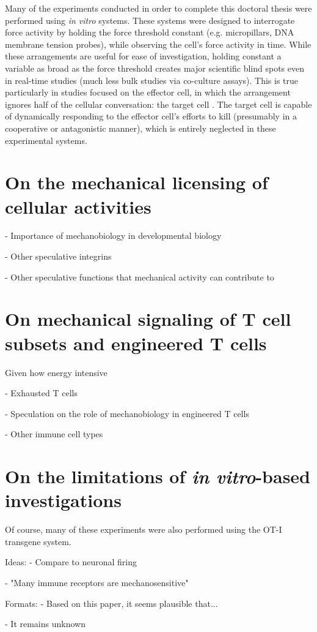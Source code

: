 Many of the experiments conducted in order to complete this doctoral thesis were performed using \textit{in vitro} systems. These systems were designed to interrogate force activity by holding the force threshold constant (e.g. micropillars, DNA membrane tension probes), while observing the cell's force activity in time. While these arrangements are useful for ease of investigation, holding constant a variable as broad as the force threshold creates major scientific blind spots even in real-time studies (much less bulk studies via co-culture assays). This is true particularly in studies focused on the effector cell, in which the arrangement ignores half of the cellular conversation: the target cell \cite{Tello-lafoz2021}. The target cell is capable of dynamically responding to the effector cell's efforts to kill (presumably in a cooperative or antagonistic manner), which is entirely neglected in these experimental systems. 

\section{On the mechanical licensing of cellular activities}


- Importance of mechanobiology in developmental biology

- Other speculative integrins

- Other speculative functions that mechanical activity can contribute to

\section{On mechanical signaling of T cell subsets and engineered T cells}

Given how energy intensive 

- Exhausted T cells

- Speculation on the role of mechanobiology in engineered T cells

- Other immune cell types

\section{On the limitations of \textit{in vitro}-based investigations}

Of course, many of these experiments were also performed using the OT-I transgene system. 


Ideas:
- Compare to neuronal firing

- "Many immune receptors are mechanosensitive"

Formats:
- Based on this paper, it seems plausible that...

- It remains unknown 

